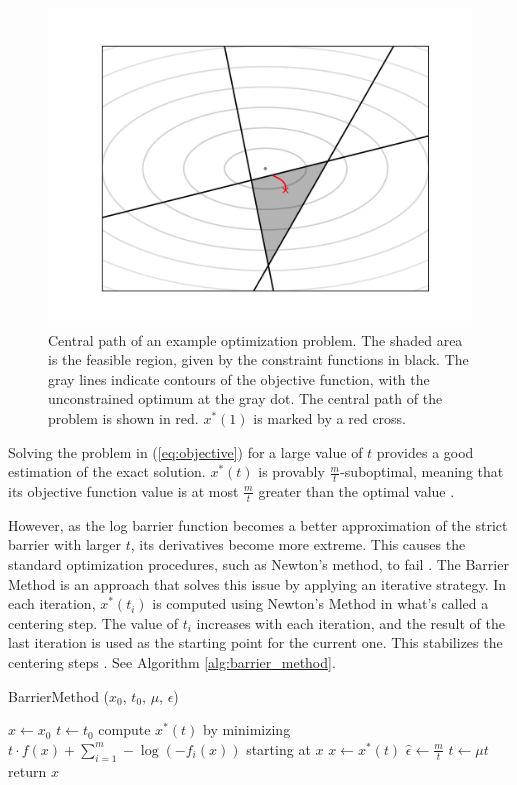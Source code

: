 \documentclass[12pt, a4paper]{report}
\begin{document}
\begin{figure}
    \centering
    \includegraphics[scale=0.6]{figs/barrier_method_example.png}
    \caption{Central path of an example optimization problem. The shaded area is the feasible region, given by the constraint functions in black. The gray lines indicate contours of the objective function, with the unconstrained optimum at the gray dot. The central path of the problem is shown in red. $x^*(1)$ is marked by a red cross.}
    \label{fig:barrier_method_example}
\end{figure}

Solving the problem in (\ref{eq:objective}) for a large value of $t$ provides a good estimation of the exact solution.
$x^*(t)$ is provably $\frac{m}{t}$-suboptimal, meaning that its objective function value is at most $\frac{m}{t}$ greater than the optimal value \cite[566]{boyd}.

However, as the log barrier function becomes a better approximation of the strict barrier with larger $t$, its derivatives become more extreme.
This causes the standard optimization procedures, such as Newton's method, to fail \cite[564]{boyd}.
The Barrier Method is an approach that solves this issue by applying an iterative strategy.
In each iteration, $x^*(t_i)$ is computed using Newton's Method in what's called a centering step.
The value of $t_i$ increases with each iteration, and the result of the last iteration is used as the starting point for the current one.
This stabilizes the centering steps \cite[569]{boyd}.
See Algorithm \ref{alg:barrier_method}.

\begin{algorithm}
    \caption[The basic Barrier Method.]{BarrierMethod ($x_0$, $t_0$, $\mu$, $\epsilon$)}
    \label{alg:barrier_method}
    \begin{algorithmic}
        \State $x \gets x_0$
        \State $t \gets t_0$
        \Repeat
            \State compute $x^*(t)$ by minimizing $t \cdot f(x) + \sum_{i=1}^m -\log(-f_i(x))$ starting at $x$
            \State $x \gets x^*(t)$
            \State $\hat{\epsilon} \gets \frac{m}{t}$
            \State $t \gets \mu t$
        \Until{$\hat{\epsilon} < \epsilon$}
        \State return $x$
    \end{algorithmic}
\end{algorithm}
\end{document}
